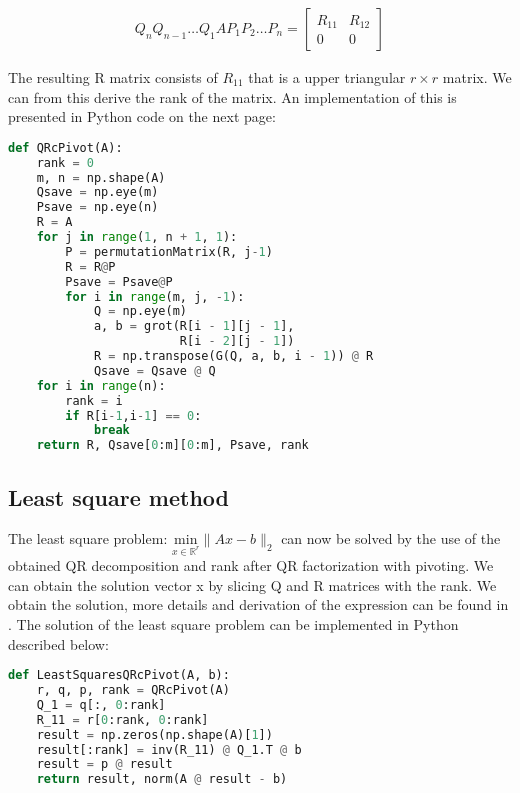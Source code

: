 \documentclass[a4paper]{article}
\begin{document}
\begin{equation}
	\begin{aligned}
	Q_nQ_{n-1} \ldots Q_1 A P_1 P_2 \ldots P_n = \begin{bmatrix} R_{11}& R_{12} \\ 0& 0 \end{bmatrix}	
	\end{aligned}
\end{equation}


The resulting R matrix consists of $R_{11}$ that is a upper triangular $r \times r$ matrix. We can from this derive the rank of the matrix. An implementation of this is presented in Python code on the next page:
\newpage

\begin{lstlisting}[language=Python]
def QRcPivot(A):
    rank = 0
    m, n = np.shape(A)
    Qsave = np.eye(m)
    Psave = np.eye(n)
    R = A
    for j in range(1, n + 1, 1):
        P = permutationMatrix(R, j-1)
        R = R@P
        Psave = Psave@P
        for i in range(m, j, -1):
            Q = np.eye(m)
            a, b = grot(R[i - 1][j - 1], 
                        R[i - 2][j - 1])
            R = np.transpose(G(Q, a, b, i - 1)) @ R
            Qsave = Qsave @ Q
    for i in range(n):
        rank = i
        if R[i-1,i-1] == 0:
            break
    return R, Qsave[0:m][0:m], Psave, rank
\end{lstlisting}

\subsection{Least square method}
The least square problem:  $\underset{x \in \mathbb{R}^{r}}{\text{min}}\|Ax-b\|_2$ can now be solved by the use of the obtained QR decomposition and rank  after QR factorization with pivoting. We can obtain the solution vector x by slicing Q and R matrices  with the rank. We obtain the solution, more details and derivation of the expression can be found in \citep{lecnotes}. The solution of the least square problem can be implemented in Python described below:

\begin{lstlisting}[language=Python]
def LeastSquaresQRcPivot(A, b):
    r, q, p, rank = QRcPivot(A)
    Q_1 = q[:, 0:rank]
    R_11 = r[0:rank, 0:rank]
    result = np.zeros(np.shape(A)[1])
    result[:rank] = inv(R_11) @ Q_1.T @ b
    result = p @ result
    return result, norm(A @ result - b)	
\end{lstlisting}
\end{document}
